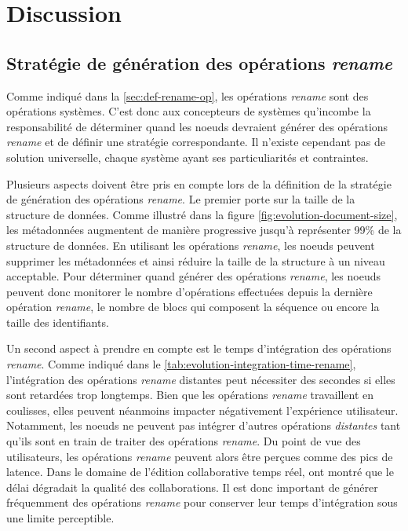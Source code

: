 \documentclass[12pt]{thesul}
\begin{document}
\section{Discussion}

\subsection{Stratégie de génération des opérations \emph{rename}}

Comme indiqué dans la \autoref{sec:def-rename-op}, les opérations \emph{rename} sont des opérations systèmes.
C'est donc aux concepteurs de systèmes qu'incombe la responsabilité de déterminer quand les noeuds devraient générer des opérations \emph{rename} et de définir une stratégie correspondante.
Il n'existe cependant pas de solution universelle, chaque système ayant ses particuliarités et contraintes.

Plusieurs aspects doivent être pris en compte lors de la définition de la stratégie de génération des opérations \emph{rename}.
Le premier porte sur la taille de la structure de données.
Comme illustré dans la figure \autoref{fig:evolution-document-size}, les métadonnées augmentent de manière progressive jusqu'à représenter 99\% de la structure de données.
En utilisant les opérations \emph{rename}, les noeuds peuvent supprimer les métadonnées et ainsi réduire la taille de la structure à un niveau acceptable.
Pour déterminer quand générer des opérations \emph{rename}, les noeuds peuvent donc monitorer le nombre d'opérations effectuées depuis la dernière opération \emph{rename}, le nombre de blocs qui composent la séquence ou encore la taille des identifiants.

Un second aspect à prendre en compte est le temps d'intégration des opérations \emph{rename}.
Comme indiqué dans le \autoref{tab:evolution-integration-time-rename}, l'intégration des opérations \emph{rename} distantes peut nécessiter des secondes si elles sont retardées trop longtemps.
Bien que les opérations \emph{rename} travaillent en coulisses, elles peuvent néanmoins impacter négativement l'expérience utilisateur.
Notamment, les noeuds ne peuvent pas intégrer d'autres opérations \emph{distantes} tant qu'ils sont en train de traiter des opérations \emph{rename}.
Du point de vue des utilisateurs, les opérations \emph{rename} peuvent alors être perçues comme des pics de latence.
Dans le domaine de l'édition collaborative temps réel, \textcite{ignat:hal-01088815,ignat:hal-01238831} ont montré que le délai dégradait la qualité des collaborations.
Il est donc important de générer fréquemment des opérations \emph{rename} pour conserver leur temps d'intégration sous une limite perceptible.
\end{document}
